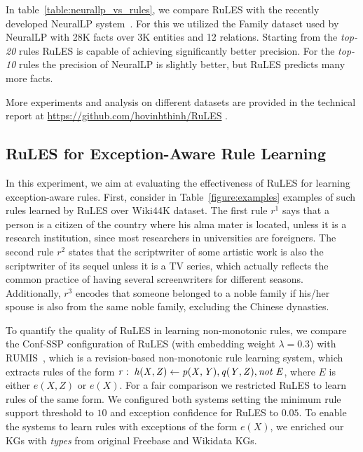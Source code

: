 In table~\ref{table:neurallp_vs_rules}, we compare RuLES with the recently developed NeuralLP system~\cite{DBLP:conf/nips/YangYC17}. For this we 
utilized the Family dataset used by NeuralLP 
with 28K facts over 3K entities and 12 relations. 
Starting from the \textit{top-20} rules RuLES is capable of achieving significantly better precision. For the \textit{top-10} rules the precision of NeuralLP is slightly better, but RuLES predicts many more facts.

More experiments and analysis on different datasets are 
provided in the technical report at \url{https://github.com/hovinhthinh/RuLES}
.

\subsection{RuLES for Exception-Aware Rule Learning}
In this experiment, we aim at evaluating the effectiveness of RuLES 
for learning exception-aware rules.
First, consider in Table~\ref{figure:examples} examples of such rules learned by RuLES over Wiki44K dataset. 
 The first rule $r^1$ says that a person is a citizen of the country where his alma mater is located, unless it is a research institution, 
since most 
researchers in universities are foreigners. The second rule $r^2$ states that the scriptwriter of some artistic work is also the scriptwriter of its sequel unless it is a TV series, which actually reflects the common practice of having several screenwriters for different seasons. Additionally, $r^3$ encodes that someone belonged to a 
noble family if his/her 
spouse is also from the same noble family, excluding the Chinese dynasties. 

To quantify the quality of RuLES in learning non-monotonic rules, we compare the Conf-SSP configuration of RuLES (with embedding weight $\lambda = 0.3$) with RUMIS~\cite{trantowards}, which is a revision-based 
non-monotonic rule 
learning system, which 
extracts rules 
of the form  
$\mathit{r:\;h(X,Z) \leftarrow p(X,Y), q(Y,Z), not\; E}$, where $E$ is either $e(X,Z)$ or 
$e(X)$.
For a fair comparison we restricted RuLES to learn rules of the same form.   
We configured both systems 
setting the minimum rule support threshold to 
$10$ and exception confidence for RuLES to $0.05$. 
To enable the systems to 
learn rules with exceptions of the form 
$e(X)$, we enriched 
our KGs with \textit{types} 
from original Freebase and Wikidata KGs. 

